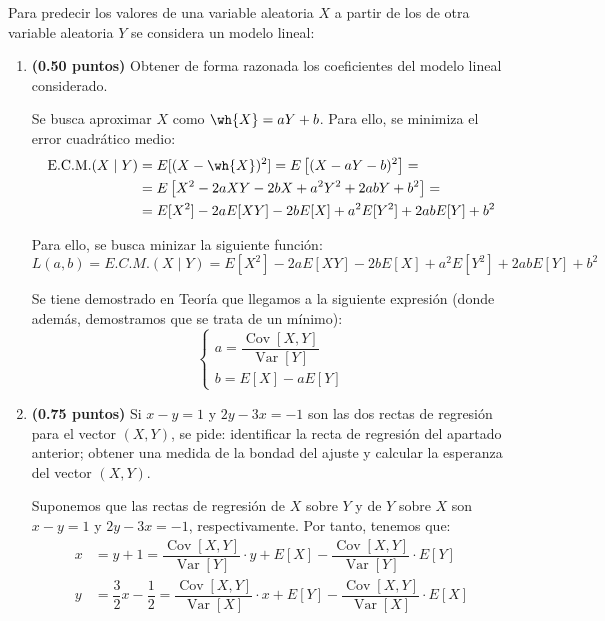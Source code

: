 \documentclass[12pt]{article}
\DeclareMathOperator{\Var}{Var}
\DeclareMathOperator{\Cov}{Cov}
\begin{document}
    \begin{ejercicio}
        Para predecir los valores de una variable aleatoria $X$ a partir de los de otra variable aleatoria $Y$ se considera un modelo lineal:
        \begin{enumerate}
            \item \textbf{(0.50 puntos)} Obtener de forma razonada los coeficientes del modelo lineal considerado.
            
            Se busca aproximar $X$ como $\wh{X}=aY+b$. Para ello, se minimiza el error cuadrático medio:
            \begin{align*}
                \text{E.C.M.}(X\mid Y) &= E[(X-\wh{X})^2]
                = E\left[(X-aY-b)^2\right]
                =\\&= E\left[X^2-2aXY-2bX+a^2Y^2+2abY+b^2\right]
                =\\&= E[X^2]-2aE[XY]-2bE[X]+a^2E[Y^2]+2abE[Y]+b^2
            \end{align*}

            Para ello, se busca minizar la siguiente función:
            \begin{equation*}
                L(a,b) = E.C.M.(X\mid Y) = E[X^2]-2aE[XY]-2bE[X]+a^2E[Y^2]+2abE[Y]+b^2
            \end{equation*}

            Se tiene demostrado en Teoría que llegamos a la siguiente expresión (donde además, demostramos que se trata de un mínimo):
            \begin{equation*}
                \begin{cases}
                    a = \dfrac{\Cov[X,Y]}{\Var[Y]} \\
                    b = E[X]-aE[Y]
                \end{cases}
            \end{equation*}

            \item \textbf{(0.75 puntos)} Si $x-y=1$ y $2y-3x=-1$ son las dos rectas de regresión para el vector $(X,Y)$, se pide: identificar la recta de regresión del apartado anterior; obtener una medida de la bondad del ajuste y calcular la esperanza del vector $(X,Y)$.
            
            Suponemos que las rectas de regresión de $X$ sobre $Y$ y de $Y$ sobre $X$ son $x-y=1$ y $2y-3x=-1$, respectivamente. Por tanto, tenemos que:
            \begin{align*}
                x &= y+1 = \dfrac{\Cov[X,Y]}{\Var[Y]}\cdot y + E[X]-\dfrac{\Cov[X,Y]}{\Var[Y]}\cdot E[Y] \\
                y &= \dfrac{3}{2}x-\dfrac{1}{2} = \dfrac{\Cov[X,Y]}{\Var[X]}\cdot x + E[Y]-\dfrac{\Cov[X,Y]}{\Var[X]}\cdot E[X]
            \end{align*}


\end{enumerate}
\end{ejercicio}
\end{document}
